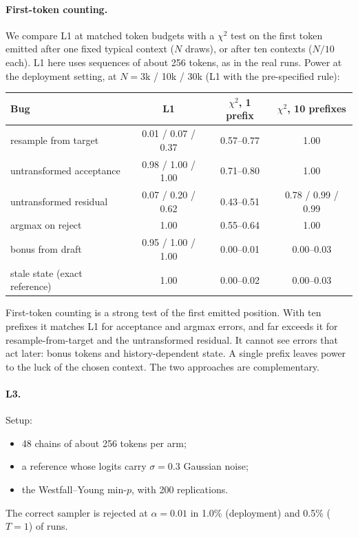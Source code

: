 \documentclass[10pt]{article}
\theoremstyle{remark}
\begin{document}
\paragraph{First-token counting.} We compare L1 at matched token budgets with a $\chi^2$ test on the first token emitted after one fixed typical context ($N$ draws), or after ten contexts ($N/10$ each). L1 here uses sequences of about 256 tokens, as in the real runs. Power at the deployment setting, at $N=3$k / 10k / 30k (L1 with the pre-specified rule):

\begin{center}\small
\begin{tabular}{lccc}
\toprule
Bug & L1 & $\chi^2$, 1 prefix & $\chi^2$, 10 prefixes \\
\midrule
resample from target & 0.01 / 0.07 / 0.37 & 0.57--0.77 & 1.00 \\
untransformed acceptance & 0.98 / 1.00 / 1.00 & 0.71--0.80 & 1.00 \\
untransformed residual & 0.07 / 0.20 / 0.62 & 0.43--0.51 & 0.78 / 0.99 / 0.99 \\
argmax on reject & 1.00 & 0.55--0.64 & 1.00 \\
bonus from draft & 0.95 / 1.00 / 1.00 & 0.00--0.01 & 0.00--0.03 \\
stale state (exact reference) & 1.00 & 0.00--0.02 & 0.00--0.03 \\
\bottomrule
\end{tabular}
\end{center}

First-token counting is a strong test of the first emitted position. With ten prefixes it matches L1 for acceptance and argmax errors, and far exceeds it for resample-from-target and the untransformed residual. It cannot see errors that act later: bonus tokens and history-dependent state. A single prefix leaves power to the luck of the chosen context. The two approaches are complementary.

\paragraph{L3.} Setup:
\begin{itemize}
\item 48 chains of about 256 tokens per arm;
\item a reference whose logits carry $\sigma{=}0.3$ Gaussian noise;
\item the Westfall--Young min-$p$, with 200 replications.
\end{itemize}
The correct sampler is rejected at $\alpha{=}0.01$ in 1.0\% (deployment) and 0.5\% ($T{=}1$) of runs.
\end{document}
